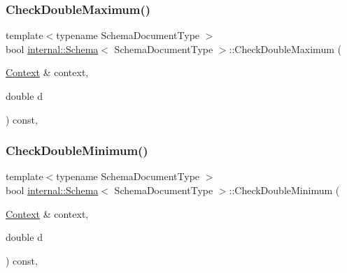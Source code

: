 \subsubsection{\texorpdfstring{Check\+Double\+Maximum()}{CheckDoubleMaximum()}}
{\footnotesize\ttfamily template$<$typename Schema\+Document\+Type $>$ \\
bool \hyperlink{classinternal_1_1Schema}{internal\+::\+Schema}$<$ Schema\+Document\+Type $>$\+::Check\+Double\+Maximum (\begin{DoxyParamCaption}\item[{\hyperlink{classinternal_1_1Schema_ac3f54abfefe300c5610c1205869cfd66}{Context} \&}]{context,  }\item[{double}]{d }\end{DoxyParamCaption}) const\hspace{0.3cm}{\ttfamily [inline]}, {\ttfamily [private]}}

\mbox{\label{classinternal_1_1Schema_a5f20099e94e0212a83844e3431c40672}} 
\subsubsection{\texorpdfstring{Check\+Double\+Minimum()}{CheckDoubleMinimum()}}
{\footnotesize\ttfamily template$<$typename Schema\+Document\+Type $>$ \\
bool \hyperlink{classinternal_1_1Schema}{internal\+::\+Schema}$<$ Schema\+Document\+Type $>$\+::Check\+Double\+Minimum (\begin{DoxyParamCaption}\item[{\hyperlink{classinternal_1_1Schema_ac3f54abfefe300c5610c1205869cfd66}{Context} \&}]{context,  }\item[{double}]{d }\end{DoxyParamCaption}) const\hspace{0.3cm}{\ttfamily [inline]}, {\ttfamily [private]}}

\mbox{\label{classinternal_1_1Schema_a37661b410dacee6924261631e4a1a2c9}} 
